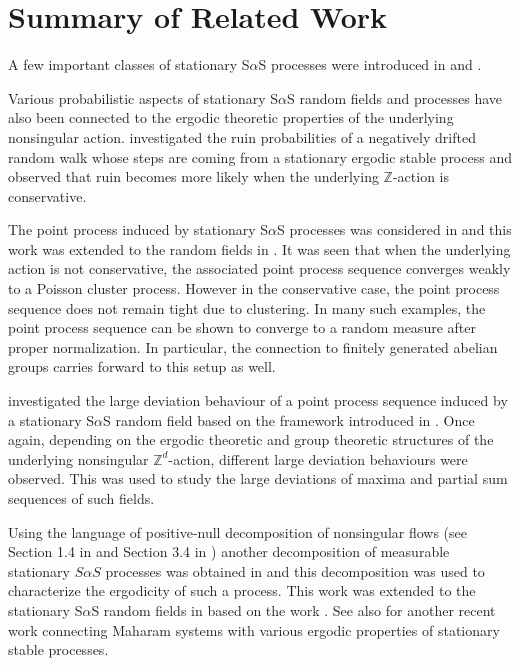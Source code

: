 \documentclass[12pt]{amsart}
\begin{document}
\section{Summary of Related Work} \label{sec:other_works}

A few important classes of stationary S$\alpha$S processes were introduced in \cite{rosinski:samorodnitsky:1996} and \cite{cohen:samorodnitsky:2006}.

Various probabilistic aspects of stationary S$\alpha$S random fields and processes have also been connected to the ergodic theoretic properties of the underlying nonsingular action. \cite{mikosch:samorodnitsky:2000a} investigated the ruin probabilities of a negatively drifted random walk whose steps are coming from a stationary ergodic stable process and observed that ruin becomes more likely when the underlying $\mathbb{Z}$-action is conservative.

The point process induced by stationary S$\alpha$S processes was considered in \cite{resnick:samorodnitsky:2004} and this work was extended to the random fields in \cite{roy:2010a}. It was seen that when the underlying action is not conservative, the associated point process sequence converges weakly to a Poisson cluster process. However in the conservative case, the point process sequence does not remain tight due to clustering. In many such examples, the point process sequence can be shown to converge to a random measure after proper normalization. In particular, the connection to finitely generated abelian groups carries forward to this setup as well.

\cite{fasen:roy:2016} investigated the large deviation behaviour of a point process sequence
induced by a stationary S$\alpha$S random field based on the framework introduced in \cite{hult:samorodnitsky:2010}. Once again, depending on the ergodic theoretic and group theoretic structures of the underlying nonsingular ${\mathbb{Z}^d}$-action, different large deviation behaviours were observed. This was used to study the large deviations of maxima and partial sum sequences of such fields.

Using the language of positive-null decomposition of nonsingular flows (see Section 1.4 in \cite{aaronson:1997} and Section 3.4 in \cite{krengel:1985}) another decomposition of measurable stationary $S\alpha S$ processes was obtained in \cite{samorodnitsky:2005a} and this decomposition was used to characterize the ergodicity of such a process. This work was extended to the stationary S$\alpha$S random fields in \cite{wang:roy:stoev:2013} based on the work \cite{takahashi:1971}. See also \cite{roy:2012} for another recent work connecting Maharam systems with various ergodic properties of stationary stable processes.
\end{document}
